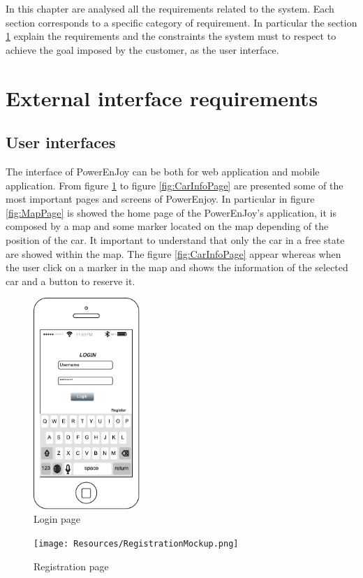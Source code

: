 In this chapter are analysed all the requirements related to the system. Each section corresponds to a specific category of requirement. In particular the section \ref{sec:ExternalInterface} explain the requirements and the constraints the system must to respect to achieve the goal imposed by the customer, as the user interface.
\section{External interface requirements}\label{sec:ExternalInterface}
\subsection{User interfaces}
The interface of PowerEnJoy can be both for web application and mobile application. From figure \ref{fig:LogPage} to figure \ref{fig:CarInfoPage} are presented some of the most important pages and screens of PowerEnjoy. In particular in figure \ref{fig:MapPage} is showed the home page of the PowerEnJoy's application, it is composed by a map and some marker located on the map depending of the position of the car. It important to understand that only the car in a free state are showed within the map. The figure \ref{fig:CarInfoPage} appear whereas when the user click on a marker in the map and shows the information of the selected car and a button to reserve it.
	\begin{figure}[H]
		\centering
		\includegraphics[height=8cm]{Resources/LoginMockup.pdf}
		\caption{Login page}
		 \label{fig:LogPage}
	\end{figure}
	\begin{figure}[H]
		\centering
		\texttt{[image: Resources/RegistrationMockup.png]}
		\caption{Registration page}
		 \label{fig:RegistrationPage}
	\end{figure}
